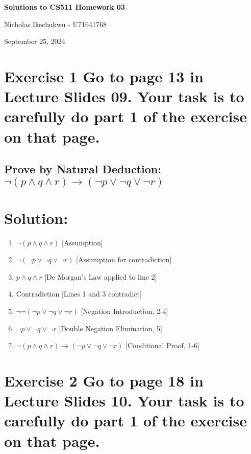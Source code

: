 \documentclass{article}
\begin{document}
\begin{center}
    \Large\textbf{Solutions to CS511 Homework 03}
    
    \vspace{0.5cm}
    
    \large Nicholas Ikechukwu - U71641768
    
    \vspace{0.3cm}
    
    \large September 25, 2024
\end{center}



\section*{Exercise 1 Go to page 13 in Lecture Slides 09. Your task is to carefully do part 1 of the exercise
on that page.}

\subsection*{Prove by Natural Deduction: $\neg(p \wedge q \wedge r)\rightarrow (\neg p \vee \neg q \vee \neg r)$}
\section*{Solution:}

\begin{enumerate}
    \item $\neg(p \wedge q \wedge r)$  \hfill [Assumption]
    \item $\neg(\neg p \vee \neg q \vee \neg r)$  \hfill [Assumption for contradiction]
    \item $p \wedge q \wedge r$  \hfill [De Morgan's Law applied to line 2]
    \item Contradiction  \hfill [Lines 1 and 3 contradict]
    \item $\neg\neg(\neg p \vee \neg q \vee \neg r)$  \hfill [Negation Introduction, 2-4]
    \item $\neg p \vee \neg q \vee \neg r$  \hfill [Double Negation Elimination, 5]
    \item $\neg(p \wedge q \wedge r) \to (\neg p \vee \neg q \vee \neg r)$  \hfill [Conditional Proof, 1-6]
\end{enumerate}

\newpage

\section*{Exercise 2 Go to page 18 in Lecture Slides 10. Your task is to carefully do part 1 of the exercise
on that page. }
\end{document}
